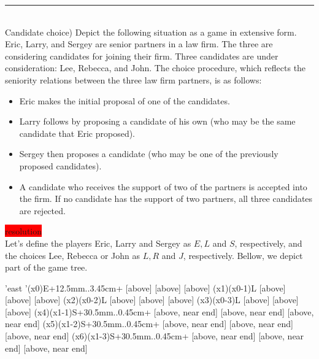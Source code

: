 \documentclass[10pt]{report}
\newenvironment{exercise}[1]
    {\vspace{0.5cm}\hrule\vspace{0.5cm}\noindent\fbox{#1}\\}
    {\vspace{0.5cm}}
\newenvironment{response}
{\vspace{0.2cm}\noindent\colorbox{red}{resolution}}
    {\vspace{0.5cm}}
\begin{document}
\begin{exercise}{3.2}
	(Candidate choice) Depict the following situation as a game in extensive form. Eric, Larry, and Sergey are senior partners in a law firm. The three are considering candidates for joining their firm. Three candidates are under consideration: Lee, Rebecca, and John. The choice procedure, which reflects the seniority relations between the three law firm partners, is as follows:
	\begin{itemize}
		\item Eric makes the initial proposal of one of the candidates.
		\item Larry follows by proposing a candidate of his own (who may be the same candidate that Eric proposed).
		\item Sergey then proposes a candidate (who may be one of the previously proposed candidates).
		\item A candidate who receives the support of two of the partners is accepted into the firm. If no candidate has the support of two partners, all three candidates are rejected.
	\end{itemize}
	\begin{response}\\
		Let's define the players Eric, Larry and Sergey as $ E, L $ and $ S $, respectively, and the choices Lee, Rebecca or John as $ L,R $ and $ J $, respectively. Bellow, we depict part of the game tree.\\
		\vspace{0.5cm}

		\begin{istgame}[sloped,font=\tiny]
			\setistgrowdirection'{east}
			\setistOvalNodeStyle{.6cm}
			\istrooto'(x0){E}+{12.5mm}..{3.45cm}+
			[above] [above] [above] \endist
			\xtShowEndPoints[oval node, minimum size=6pt]
			\xtdistance{52.5mm}{11.5mm}
			\istrooto(x1)(x0-1){L}
			[above]
			[above]
			[above]
			\endist
			\istrooto(x2)(x0-2){L}
			[above]
			[above]
			[above]
			\endist
			\istrooto(x3)(x0-3){L}
			[above]
			[above]
			[above]
			\endist
			\istrooto(x4)(x1-1){S}+{30.5mm}..{0.45cm}+
			[above, near end]{}
			[above, near end]{}
			[above, near end]{}
			\endist
			\istrooto(x5)(x1-2){S}+{30.5mm}..{0.45cm}+
			[above, near end]{}
			[above, near end]{}
			[above, near end]{}
			\endist
			\istrooto(x6)(x1-3){S}+{30.5mm}..{0.45cm}+
			[above, near end]{}
			[above, near end]{}
			[above, near end]{}
			\endist
		\end{istgame}

	\end{response}
\end{exercise}
\end{document}
